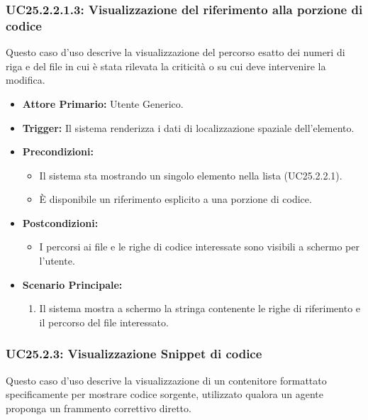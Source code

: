 \documentclass[12pt, a4paper]{article}
\begin{document}
\subsubsection{UC25.2.2.1.3: Visualizzazione del riferimento alla porzione di codice}\label{uc:25.2.2.1.3}
Questo caso d'uso descrive la visualizzazione del percorso esatto dei numeri di riga e del file in cui è stata rilevata la criticità o su cui deve intervenire la modifica.

\begin{itemize}
    \item \textbf{Attore Primario:} Utente Generico.
    \item \textbf{Trigger:} Il sistema renderizza i dati di localizzazione spaziale dell'elemento.
    \item \textbf{Precondizioni:}
    \begin{itemize}
        \item Il sistema sta mostrando un singolo elemento nella lista (UC25.2.2.1).
        \item È disponibile un riferimento esplicito a una porzione di codice.
    \end{itemize}
    \item \textbf{Postcondizioni:}
    \begin{itemize}
        \item I percorsi ai file e le righe di codice interessate sono visibili a schermo per l'utente.
    \end{itemize}
    \item \textbf{Scenario Principale:}
    \begin{enumerate}
        \item Il sistema mostra a schermo la stringa contenente le righe di riferimento e il percorso del file interessato.
    \end{enumerate}
\end{itemize}

\subsubsection{UC25.2.3: Visualizzazione Snippet di codice}\label{uc:25.2.3}
Questo caso d'uso descrive la visualizzazione di un contenitore formattato specificamente per mostrare codice sorgente, utilizzato qualora un agente proponga un frammento correttivo diretto.
\end{document}
